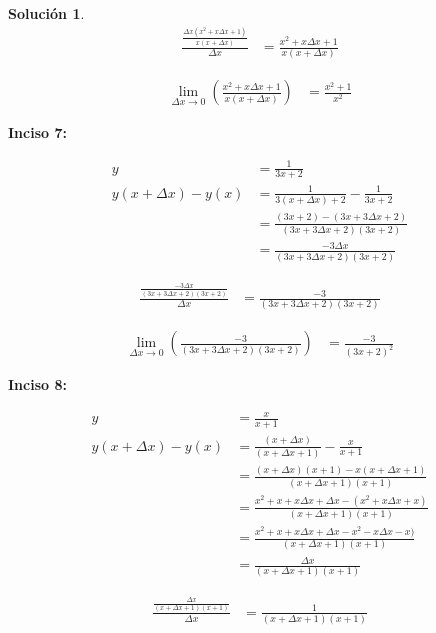 \documentclass{article}
\theoremstyle{definition}
\newtheorem*{solution}{Solución}
\begin{document}
\begin{solution}
    \begin{align*}
        \frac{\frac{\Delta x(x^2+x\Delta x+1)}{x(x+\Delta x)}}{\Delta x} &= \frac{x^2+x\Delta x+1}{x(x+\Delta x)}
    \end{align*}

    \begin{align*}
        \lim_{\Delta x \to 0} (\frac{x^2+x\Delta x+1}{x(x+\Delta x)}) &= \frac{x^2+1}{x^2}
    \end{align*}  

\textbf{Inciso 7:}

    \begin{align*}
        y &= \frac{1}{3x+2} \\
        y(x+\Delta x) - y(x) &= \frac{1}{3(x+\Delta x)+2} - \frac{1}{3x+2} \\
        &= \frac{(3x+2)-(3x+3\Delta x+2)}{(3x+3\Delta x+2)(3x+2)} \\
        &= \frac{-3\Delta x}{(3x+3\Delta x+2)(3x+2)}
    \end{align*}

    \begin{align*}
        \frac{\frac{-3\Delta x}{(3x+3\Delta x+2)(3x+2)}}{\Delta x} &= \frac{-3}{(3x+3\Delta x+2)(3x+2)}    
    \end{align*}

    \begin{align*}
        \lim_{\Delta x \to 0} (\frac{-3}{(3x+3\Delta x+2)(3x+2)}   ) &= \frac{-3}{(3x+2)^2}
    \end{align*}  

\textbf{Inciso 8:}

    \begin{align*}
        y &= \frac{x}{x+1} \\
        y(x+\Delta x) - y(x) &= \frac{(x+\Delta x)}{(x+\Delta x+1)}-\frac{x}{x+1} \\
        &= \frac{(x+\Delta x)(x+1)-x(x+\Delta x+1)}{(x+\Delta x+1)(x+1)} \\
        &= \frac{x^2+x+x\Delta x+\Delta x-(x^2+x\Delta x+x)}{(x+\Delta x+1)(x+1)} \\
        &= \frac{x^2+x+x\Delta x+\Delta x-x^2-x\Delta x-x)}{(x+\Delta x+1)(x+1)} \\
        &= \frac{\Delta x}{(x+\Delta x+1)(x+1)}
    \end{align*}

    \begin{align*}
        \frac{\frac{\Delta x}{(x+\Delta x+1)(x+1)}}{\Delta x} &= \frac{1}{(x+\Delta x+1)(x+1)}    
    \end{align*}


\end{solution}
\end{document}
